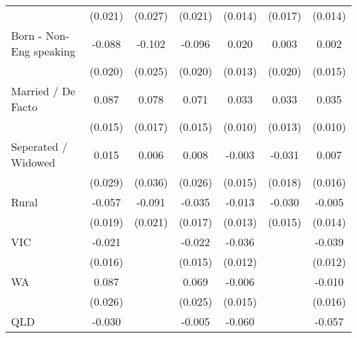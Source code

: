 {\begin{tabular}{l*{6}{c}}
                    &     (0.021)         &     (0.027)         &     (0.021)         &     (0.014)         &     (0.017)         &     (0.014)         \\
Born - Non-Eng speaking&      -0.088\sym{***}&      -0.102\sym{***}&      -0.096\sym{***}&       0.020         &       0.003         &       0.002         \\
                    &     (0.020)         &     (0.025)         &     (0.020)         &     (0.013)         &     (0.020)         &     (0.015)         \\
Married / De Facto  &       0.087\sym{***}&       0.078\sym{***}&       0.071\sym{***}&       0.033\sym{***}&       0.033\sym{**} &       0.035\sym{***}\\
                    &     (0.015)         &     (0.017)         &     (0.015)         &     (0.010)         &     (0.013)         &     (0.010)         \\
Seperated / Widowed &       0.015         &       0.006         &       0.008         &      -0.003         &      -0.031\sym{*}  &       0.007         \\
                    &     (0.029)         &     (0.036)         &     (0.026)         &     (0.015)         &     (0.018)         &     (0.016)         \\
Rural               &      -0.057\sym{***}&      -0.091\sym{***}&      -0.035\sym{**} &      -0.013         &      -0.030\sym{**} &      -0.005         \\
                    &     (0.019)         &     (0.021)         &     (0.017)         &     (0.013)         &     (0.015)         &     (0.014)         \\
VIC                 &      -0.021         &                     &      -0.022         &      -0.036\sym{***}&                     &      -0.039\sym{***}\\
                    &     (0.016)         &                     &     (0.015)         &     (0.012)         &                     &     (0.012)         \\
WA                  &       0.087\sym{***}&                     &       0.069\sym{***}&      -0.006         &                     &      -0.010         \\
                    &     (0.026)         &                     &     (0.025)         &     (0.015)         &                     &     (0.016)         \\
QLD                 &      -0.030         &                     &      -0.005         &      -0.060\sym{***}&                     &      -0.057\sym{***}\\

\end{tabular}}
